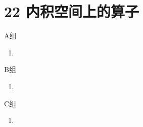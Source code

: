 \section*{22 内积空间上的算子}

\vspace{2ex}

\centerline{\heiti A组}
\begin{enumerate}
    \item
\end{enumerate}

\centerline{\heiti B组}
\begin{enumerate}
    \item
\end{enumerate}

\centerline{\heiti C组}
\begin{enumerate}
    \item
\end{enumerate}

\clearpage
